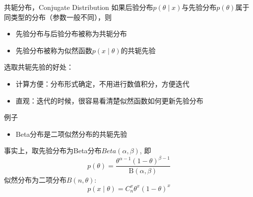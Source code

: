 \documentclass[10pt]{beamer}
\begin{document}
\begin{frame}

\begin{block}{共轭分布，Conjugate Distribution}
如果后验分布$p(\theta \mid x)$与先验分布$p(\theta)$属于同类型的分布（参数一般不同），则
\begin{itemize}
\item 先验分布与后验分布被称为共轭分布
\item 先验分布被称为似然函数$p(x \mid \theta)$的共轭先验
\end{itemize}
\end{block}

\vspace{1em}
\pause

选取共轭先验的好处：
\begin{itemize}
\item 计算方便：分布形式确定，不用进行数值积分，方便迭代
\item 直观：迭代的时候，很容易看清楚似然函数如何更新先验分布
\end{itemize}

\end{frame}


\begin{frame}

\begin{block}{例子}
\begin{itemize}
\item Beta分布是二项似然分布的共轭先验
\end{itemize}

\vspace{1em}
\pause

事实上，取先验分布为Beta分布$Beta(\alpha,\beta)$, 即
$$p(\theta) = \dfrac{\theta^{\alpha-1} (1-\theta)^{\beta-1}}{\mathrm{B}(\alpha,\beta)}$$
似然分布为二项分布$B(n,\theta)$:
$$p(x \mid \theta) = C_n^x \theta^x (1-\theta)^x$$
\end{block}

\end{frame}

\end{document}

